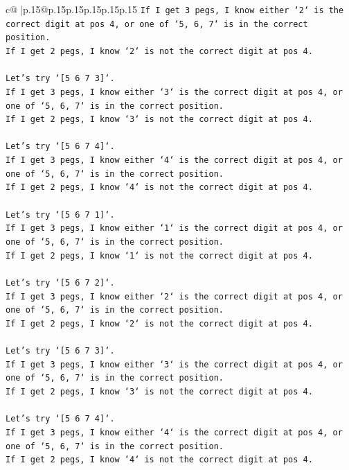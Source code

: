 \documentclass{article}
\begin{document}
{\begin{supertabular}{c@{$\;$}|p{.15\linewidth}@{}p{.15\linewidth}p{.15\linewidth}p{.15\linewidth}p{.15\linewidth}p{.15\linewidth}}
{{{\texttt{If I get 3 pegs, I know either `2` is the correct digit at pos 4, or one of `5, 6, 7` is in the correct position.} \\
\texttt{If I get 2 pegs, I know `2` is not the correct digit at pos 4.} \\
\\ 
\texttt{Let's try `{[}5 6 7 3{]}`.} \\
\texttt{If I get 3 pegs, I know either `3` is the correct digit at pos 4, or one of `5, 6, 7` is in the correct position.} \\
\texttt{If I get 2 pegs, I know `3` is not the correct digit at pos 4.} \\
\\ 
\texttt{Let's try `{[}5 6 7 4{]}`.} \\
\texttt{If I get 3 pegs, I know either `4` is the correct digit at pos 4, or one of `5, 6, 7` is in the correct position.} \\
\texttt{If I get 2 pegs, I know `4` is not the correct digit at pos 4.} \\
\\ 
\texttt{Let's try `{[}5 6 7 1{]}`.} \\
\texttt{If I get 3 pegs, I know either `1` is the correct digit at pos 4, or one of `5, 6, 7` is in the correct position.} \\
\texttt{If I get 2 pegs, I know `1` is not the correct digit at pos 4.} \\
\\ 
\texttt{Let's try `{[}5 6 7 2{]}`.} \\
\texttt{If I get 3 pegs, I know either `2` is the correct digit at pos 4, or one of `5, 6, 7` is in the correct position.} \\
\texttt{If I get 2 pegs, I know `2` is not the correct digit at pos 4.} \\
\\ 
\texttt{Let's try `{[}5 6 7 3{]}`.} \\
\texttt{If I get 3 pegs, I know either `3` is the correct digit at pos 4, or one of `5, 6, 7` is in the correct position.} \\
\texttt{If I get 2 pegs, I know `3` is not the correct digit at pos 4.} \\
\\ 
\texttt{Let's try `{[}5 6 7 4{]}`.} \\
\texttt{If I get 3 pegs, I know either `4` is the correct digit at pos 4, or one of `5, 6, 7` is in the correct position.} \\
\texttt{If I get 2 pegs, I know `4` is not the correct digit at pos 4.} \\
}}}
\end{supertabular}}
\end{document}
